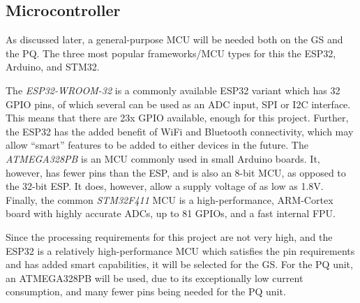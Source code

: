 \subsection{Microcontroller}
As discussed later, a general-purpose MCU will be needed both on the GS and the PQ. The three most popular frameworks/MCU types for this the ESP32, Arduino, and STM32.

The \textit{ESP32-WROOM-32} is a commonly available ESP32 variant which has 32 GPIO pins, of which several can be used as an ADC input, SPI or I2C interface. This means that there are 23x GPIO available, enough for this project. Further, the ESP32 has the added benefit of WiFi and Bluetooth connectivity, which may allow “smart” features to be added to either devices in the future. The \textit{ATMEGA328PB} is an MCU commonly used in small Arduino boards. It, however, has fewer pins than the ESP, and is also an 8-bit MCU, as opposed to the 32-bit ESP. It does, however, allow a supply  voltage of as low as 1.8V. Finally, the common \textit{STM32F411} MCU is a high-performance, ARM-Cortex board with highly accurate ADCs, up to 81 GPIOs, and a fast internal FPU.

Since the processing requirements for this project are not very high, and the ESP32 is a relatively high-performance MCU which satisfies the pin requirements and has added smart capabilities, it will be selected for the GS. For the PQ unit, an ATMEGA328PB will be used, due to its exceptionally low current consumption, and many fewer pins being needed for the PQ unit.